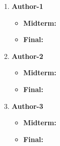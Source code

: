 \documentclass[twocolumn]{article}
\begin{document}
\begin{enumerate}
\item {\bf Author-1}
\begin{itemize}
\item {\bf Midterm:}
\item {\bf Final:}
\end{itemize}
\item {\bf Author-2}
\begin{itemize}
\item {\bf Midterm:}
\item {\bf Final:}
\end{itemize}
\item {\bf Author-3}
\begin{itemize}
\item {\bf Midterm:}
\item {\bf Final:}
\end{itemize}
\end{enumerate}



\end{document}
